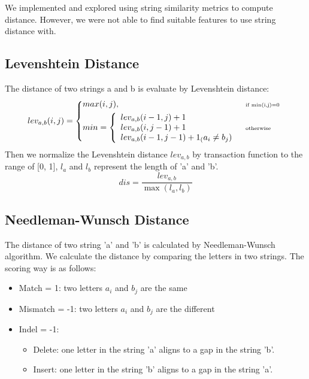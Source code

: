 \documentclass{article}
\begin{document}
We implemented and explored using string similarity metrics to compute distance.
However, we were not able to find suitable features to use string distance with.

\subsection{Levenshtein Distance}
The distance of two strings a and b is evaluate by Levenshtein distance:
\begin{equation}
  lev_{a,b}(i,j) = \left \{
  \begin{aligned}
    &max(i,j), && \text{\tiny if min(i,j)=0}\  \\
    &
    min= \left\{
    \begin{array}{ll}
    lev_{a,b}(i-1,j)+1\\
    lev_{a,b}(i,j-1)+1\\
    lev_{a,b}(i-1,j-1)+1_(a_{i}\not=b_{j})
    \end{array}\right.
    && \text{\tiny otherwise}
  \end{aligned} \right.
\end{equation}
Then we normalize the Levenshtein distance $lev_{a,b}$ by transaction function to the range of [0, 1], $l_{a}$ and $l_{b}$ represent the length of 'a' and 'b'.
$$dis = \frac{lev_{a,b}}{{\max}(l_{a}, l_{b})}  $$

\subsection{Needleman-Wunsch Distance}
The distance of two string 'a' and 'b' is calculated by Needleman-Wunsch algorithm. We calculate the distance by comparing the letters in two strings. The scoring way is as follows:
\begin{itemize}
  \item  Match = 1: two letters $a_{i}$ and $b_{j}$ are the same 
  \item  Mismatch = -1: two letters $a_{i}$ and $b_{j}$ are the different 
  \item  Indel = -1:
  \begin{itemize}
  	\item Delete: one letter in the string 'a' aligns to a gap in the string 'b'.
    \item Insert: one letter in the string 'b' aligns to a gap in the string 'a'.
  \end{itemize}
  		
\end{itemize}
\end{document}
